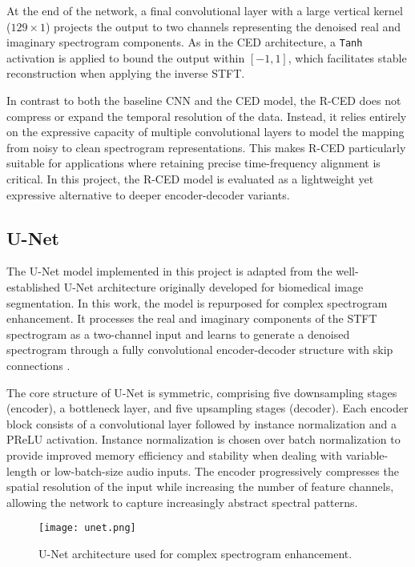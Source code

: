 At the end of the network, a final convolutional layer with a large vertical kernel (\(129 \times 1\)) projects the output to two channels representing the denoised real and imaginary spectrogram components. As in the CED architecture, a \texttt{Tanh} activation is applied to bound the output within \([-1, 1]\), which facilitates stable reconstruction when applying the inverse STFT.

In contrast to both the baseline CNN and the CED model, the R-CED does not compress or expand the temporal resolution of the data. Instead, it relies entirely on the expressive capacity of multiple convolutional layers to model the mapping from noisy to clean spectrogram representations. This makes R-CED particularly suitable for applications where retaining precise time-frequency alignment is critical. In this project, the R-CED model is evaluated as a lightweight yet expressive alternative to deeper encoder-decoder variants.

\subsection{U-Net}

The U-Net model implemented in this project is adapted from the well-established U-Net architecture originally developed for biomedical image segmentation. In this work, the model is repurposed for complex spectrogram enhancement. It processes the real and imaginary components of the STFT spectrogram as a two-channel input and learns to generate a denoised spectrogram through a fully convolutional encoder-decoder structure with skip connections \cite{ronneberger2015unet}.

The core structure of U-Net is symmetric, comprising five downsampling stages (encoder), a bottleneck layer, and five upsampling stages (decoder). Each encoder block consists of a convolutional layer followed by instance normalization and a PReLU activation. Instance normalization is chosen over batch normalization to provide improved memory efficiency and stability when dealing with variable-length or low-batch-size audio inputs. The encoder progressively compresses the spatial resolution of the input while increasing the number of feature channels, allowing the network to capture increasingly abstract spectral patterns.

\begin{figure}[h]
    \centering
    \texttt{[image: unet.png]}
    \caption{\label{fig:unet}U-Net architecture used for complex spectrogram enhancement.}
\end{figure}

